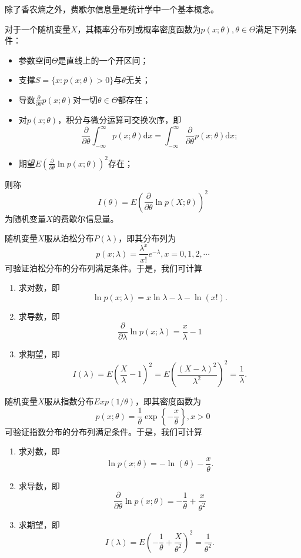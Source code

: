 除了香农熵之外，费歇尔信息量是统计学中一个基本概念。
\begin{definition}
    对于一个随机变量$X$，其概率分布列或概率密度函数为$p(x;\theta), \theta \in \Theta$满足下列条件：
    \begin{itemize}
        \item 参数空间$\Theta$是直线上的一个开区间；
        \item 支撑$S = \{x:p(x;\theta)>0\}$与$\theta$无关；
        \item 导数$\frac{\partial }{\partial \theta}p(x;\theta)$对一切$\theta \in \Theta$都存在；
        \item 对$p(x;\theta)$，积分与微分运算可交换次序，即
        $$
        \frac{\partial }{\partial \theta} \int_{-\infty}^{\infty} p(x;\theta)\text{d} x =  \int_{-\infty}^{\infty} \frac{\partial }{\partial \theta}p(x;\theta)\text{d} x;
        $$
        \item 期望$E\left(\frac{\partial }{\partial \theta} \ln p(x;\theta)  \right)^2$存在；
    \end{itemize}
    则称
    $$
    I(\theta) = E\left(\frac{\partial }{\partial \theta} \ln p(X;\theta)  \right)^2
    $$
    为随机变量$X$的费歇尔信息量。
\end{definition}

\begin{example}
    随机变量$X$服从泊松分布$P(\lambda)$，即其分布列为
    $$
    p(x;\lambda) = \frac{\lambda^x}{x!}e^{-\lambda}, x=0,1,2,\cdots
    $$
    可验证泊松分布的分布列满足条件。于是，我们可计算
    \begin{enumerate}
        \item 求对数，即
        $$
        \ln p(x;\lambda) = x\ln \lambda - \lambda - \ln(x!).
        $$
        \item 求导数，即
        $$
        \frac{\partial }{\partial \lambda}  \ln p(x;\lambda) = \frac{x}{\lambda} - 1
        $$
        \item 求期望，即
$$
I(\lambda ) = E\left( \frac{X}{\lambda} - 1 \right)^2 = E\left( \frac{(X-\lambda)^2}{\lambda^2}  \right)^2 = \frac{1}{\lambda}.
$$
    \end{enumerate}
\end{example}

\begin{example}
    随机变量$X$服从指数分布$Exp(1/\theta)$，即其密度函数为
    $$
    p(x;\theta) = \frac{1}{\theta} \exp\left\{-\frac{x}{\theta}\right\}, x>0
    $$
    可验证指数分布的分布列满足条件。于是，我们可计算
    \begin{enumerate}
        \item 求对数，即
        $$
        \ln p(x;\theta) = -\ln(\theta) - \frac{x}{\theta}.
        $$
        \item 求导数，即
        $$
        \frac{\partial }{\partial \theta}  \ln p(x;\theta) = -\frac{1}{\theta} + \frac{x}{\theta^2}
        $$
        \item 求期望，即
$$
I(\lambda ) = E\left( -\frac{1}{\theta} + \frac{X}{\theta^2} \right)^2 = \frac{1}{\theta^2}.
$$
    \end{enumerate}
\end{example}


